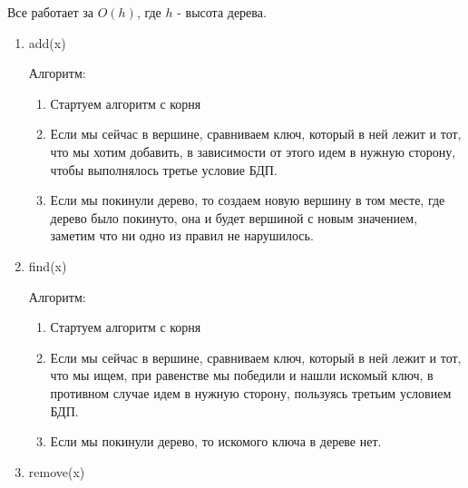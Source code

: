  Все работает за $O(h)$, где $h$ - высота дерева.
\newpage
{}
\begin{enumerate}
    \item add(x)
    
    Алгоритм:
    \begin{enumerate}
        \item Стартуем алгоритм с корня
        \item Если мы сейчас в вершине, сравниваем ключ, который в ней лежит и тот, что мы хотим добавить, в зависимости от этого идем в нужную сторону, чтобы выполнялось третье условие БДП.
        \item Если мы покинули дерево, то создаем новую вершину в том месте, где дерево было покинуто, она и будет вершиной с новым значением, заметим что ни одно из правил не нарушилось.
    \end{enumerate}
    \item find(x)
    
    Алгоритм:
    \begin{enumerate}
        \item Стартуем алгоритм с корня
        \item Если мы сейчас в вершине, сравниваем ключ, который в ней лежит и тот, что мы ищем, при равенстве мы победили и нашли искомый ключ, в противном случае идем в нужную сторону, пользуясь третьим условием БДП.
        \item Если мы покинули дерево, то искомого ключа в дереве нет.
    \end{enumerate}
    \item remove(x)
    

\end{enumerate}
